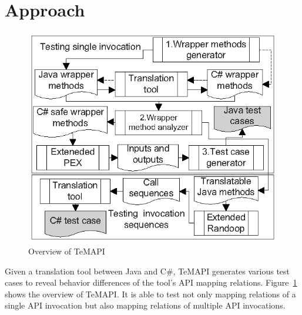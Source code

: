 \section{Approach}
\label{sec:approach}
\begin{figure}[t]
\centering
\includegraphics[scale=1,clip]{figure/approach.eps}\vspace*{-3ex}
 \caption{Overview of TeMAPI}\vspace*{-4ex}
 \label{fig:approach}
\end{figure}
Given a translation tool between Java and C\#, TeMAPI generates various test cases to reveal behavior differences of the tool's API mapping relations.
Figure~\ref{fig:approach} shows the overview of TeMAPI. It is able to test not only mapping relations of a single API invocation but also mapping relations of multiple API invocations.


